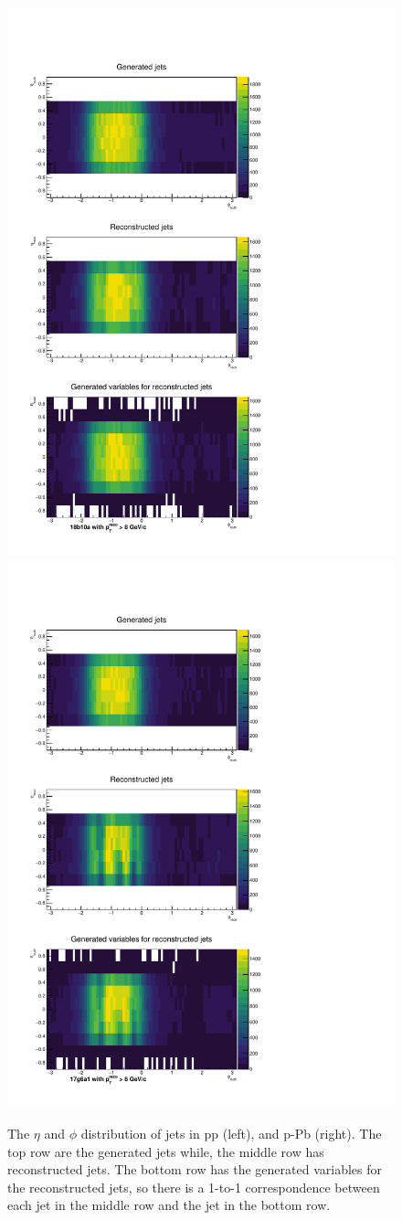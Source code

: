 \begin{figure}[h]
\center
\includegraphics[width=.495\textwidth]{JetResponse/jets_etaPhi_its_pp.pdf}
\includegraphics[width=.495\textwidth]{JetResponse/jets_etaPhi_its_pPb.pdf}
\caption{The $\eta$ and $\phi$ distribution of jets in pp (left), and p-Pb (right). The top row are the generated jets while, the middle row has reconstructed jets. The bottom row has the generated variables for the reconstructed jets, so there is a 1-to-1 correspondence between each jet in the middle row and the jet in the bottom row.}
\label{fig:2Djets}
\end{figure}

